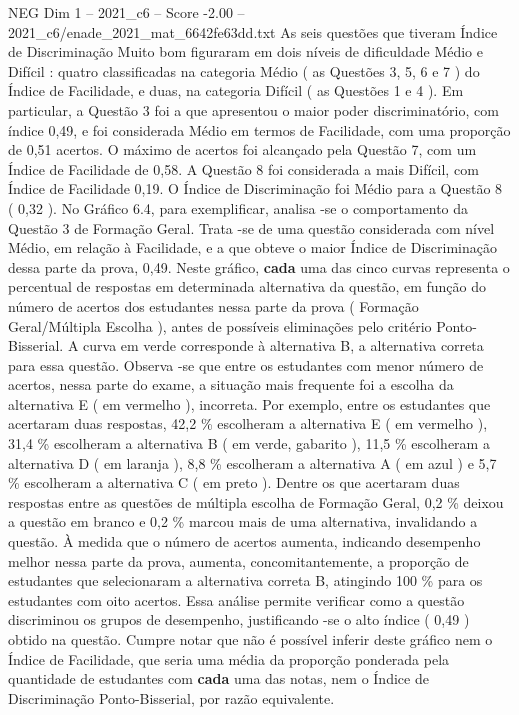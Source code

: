 \begin{textsample}{NEG Dim 1 – 2021\_c6 – Score -2.00 – 2021\_c6/enade\_2021\_mat\_6642fe63dd.txt}
As seis questões que tiveram Índice de Discriminação Muito bom figuraram em dois níveis de dificuldade Médio e Difícil : quatro classificadas na categoria Médio ( as Questões 3, 5, 6 e 7 ) do Índice de Facilidade, e duas, na categoria Difícil ( as Questões 1 e 4 ).
Em particular, a Questão 3 foi a que apresentou o maior poder discriminatório, com índice 0,49, e foi considerada Médio em termos de Facilidade, com uma proporção de 0,51 acertos.
O máximo de acertos foi alcançado pela Questão 7, com um Índice de Facilidade de 0,58.
A Questão 8 foi considerada a mais Difícil, com Índice de Facilidade 0,19.
O Índice de Discriminação foi Médio para a Questão 8 ( 0,32 ).
No Gráfico 6.4, para exemplificar, analisa -se o comportamento da Questão 3 de Formação Geral.
Trata -se de uma questão considerada com nível Médio, em relação à Facilidade, e a que obteve o maior Índice de Discriminação dessa parte da prova, 0,49.
Neste gráfico, \textbf{cada} uma das cinco curvas representa o percentual de respostas em determinada alternativa da questão, em função do número de acertos dos estudantes nessa parte da prova ( Formação Geral/Múltipla Escolha ), antes de possíveis eliminações pelo critério Ponto-Bisserial.
A curva em verde corresponde à alternativa B, a alternativa correta para essa questão.
Observa -se que entre os estudantes com menor número de acertos, nessa parte do exame, a situação mais frequente foi a escolha da alternativa E ( em vermelho ), incorreta.
Por exemplo, entre os estudantes que acertaram duas respostas, 42,2 \% escolheram a alternativa E ( em vermelho ), 31,4 \% escolheram a alternativa B ( em verde, gabarito ), 11,5 \% escolheram a alternativa D ( em laranja ), 8,8 \% escolheram a alternativa A ( em azul ) e 5,7 \% escolheram a alternativa C ( em preto ).
Dentre os que acertaram duas respostas entre as questões de múltipla escolha de Formação Geral, 0,2 \% deixou a questão em branco e 0,2 \% marcou mais de uma alternativa, invalidando a questão.
À medida que o número de acertos aumenta, indicando desempenho melhor nessa parte da prova, aumenta, concomitantemente, a proporção de estudantes que selecionaram a alternativa correta B, atingindo 100 \% para os estudantes com oito acertos.
Essa análise permite verificar como a questão discriminou os grupos de desempenho, justificando -se o alto índice ( 0,49 ) obtido na questão.
Cumpre notar que não é possível inferir deste gráfico nem o Índice de Facilidade, que seria uma média da proporção ponderada pela quantidade de estudantes com \textbf{cada} uma das notas, nem o Índice de Discriminação Ponto-Bisserial, por razão equivalente.

\end{textsample}
